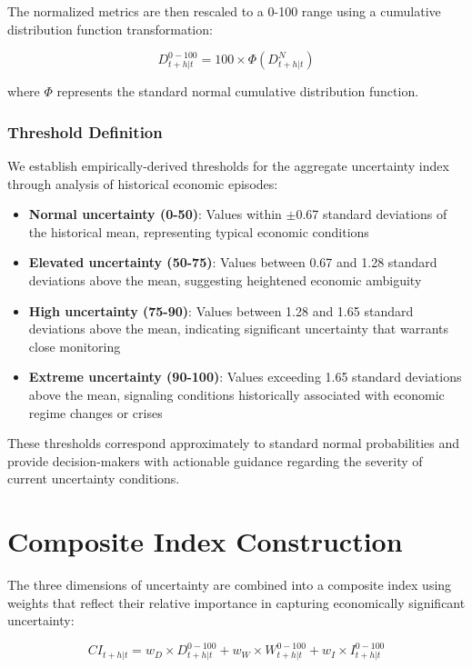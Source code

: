\documentclass[5p,authoryear]{elsarticle}
\begin{document}
The normalized metrics are then rescaled to a 0-100 range using a cumulative distribution function transformation:

\begin{equation}
D^{0-100}_{t+h|t} = 100 \times \Phi(D^N_{t+h|t})
\end{equation}

where $\Phi$ represents the standard normal cumulative distribution function.

\subsubsection{Threshold Definition}

We establish empirically-derived thresholds for the aggregate uncertainty index through analysis of historical economic episodes:

\begin{itemize}
    \item \textbf{Normal uncertainty (0-50)}: Values within $\pm$0.67 standard deviations of the historical mean, representing typical economic conditions
    \item \textbf{Elevated uncertainty (50-75)}: Values between 0.67 and 1.28 standard deviations above the mean, suggesting heightened economic ambiguity
    \item \textbf{High uncertainty (75-90)}: Values between 1.28 and 1.65 standard deviations above the mean, indicating significant uncertainty that warrants close monitoring
    \item \textbf{Extreme uncertainty (90-100)}: Values exceeding 1.65 standard deviations above the mean, signaling conditions historically associated with economic regime changes or crises
\end{itemize}

These thresholds correspond approximately to standard normal probabilities and provide decision-makers with actionable guidance regarding the severity of current uncertainty conditions.

\section{Composite Index Construction}

The three dimensions of uncertainty are combined into a composite index using weights that reflect their relative importance in capturing economically significant uncertainty:

\begin{equation}
CI_{t+h|t} = w_D \times D^{0-100}_{t+h|t} + w_W \times W^{0-100}_{t+h|t} + w_I \times I^{0-100}_{t+h|t}
\end{equation}
\end{document}
